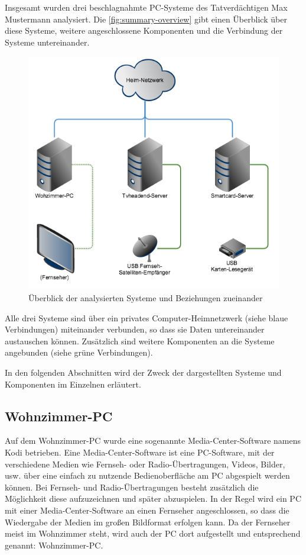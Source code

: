 Insgesamt wurden drei beschlagnahmte PC-Systeme des Tatverdächtigen Max Mustermann analysiert. Die \autoref{fig:summary-overview} gibt einen Überblick über diese Systeme, weitere angeschlossene Komponenten und die Verbindung der Systeme untereinander.

\begin{figure}[H]
\centering
\includegraphics[scale=0.5]{system-overview.png} 
\caption{Überblick der analysierten Systeme und Beziehungen zueinander}
\label{fig:summary-overview}
\end{figure}

Alle drei Systeme sind über ein privates Computer-Heimnetzwerk (siehe blaue Verbindungen) miteinander verbunden, so dass sie Daten untereinander austauschen können. Zusätzlich sind weitere Komponenten an die Systeme angebunden (siehe grüne Verbindungen).

In den folgenden Abschnitten wird der Zweck der dargestellten Systeme und  Komponenten im Einzelnen erläutert.

\subsection{Wohnzimmer-PC}

Auf dem Wohnzimmer-PC wurde eine sogenannte Media-Center-Software namens \mbox{Kodi} betrieben. Eine Media-Center-Software ist eine PC-Software, mit der verschiedene Medien wie Fernseh- oder Radio-Übertragungen, Videos, Bilder, usw. über eine einfach zu nutzende Bedienoberfläche am PC abgespielt werden können. Bei Fernseh- und Radio-Übertragungen besteht zusätzlich die Möglichkeit diese aufzuzeichnen und später abzuspielen. In der Regel wird ein PC mit einer Media-Center-Software an einen Fernseher angeschlossen, so dass die Wiedergabe der Medien im großen Bildformat erfolgen kann. Da der Fernseher meist im Wohnzimmer steht, wird auch der PC dort aufgestellt und entsprechend genannt: Wohnzimmer-PC.

